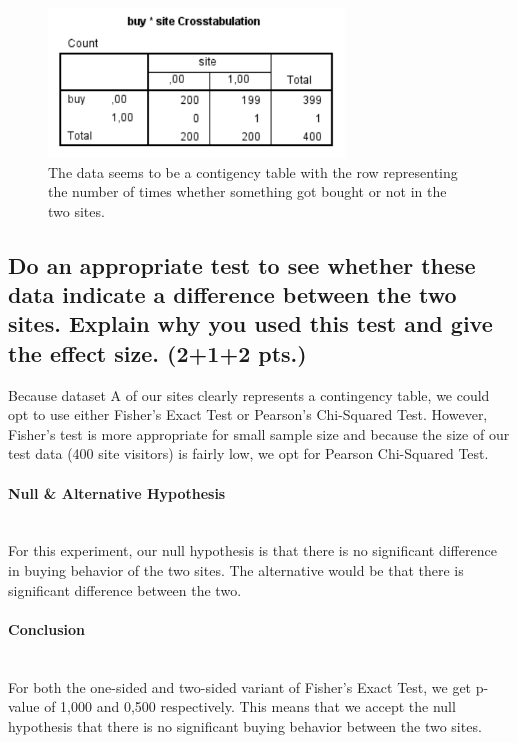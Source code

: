 \documentclass[14]{article}
\begin{document}
\begin{figure}[!htb]
	\includegraphics[width=0.7\textwidth]{img/question2/question2_a.PNG}
	\captionsetup{width=0.8\textwidth}
	\centering 
	\caption{The data seems to be a contigency table with the row representing the number of times whether something got bought or not in the two sites. } 
\end{figure}

\subsection{Do an appropriate test to see whether these data indicate a difference between the two sites. Explain why you used this test and give the effect size. (2+1+2 pts.)}
Because dataset A of our sites clearly represents a contingency table, we could opt to use either Fisher's Exact Test or Pearson's Chi-Squared Test. However, Fisher's test is more appropriate for small sample size and because the size of our test data (400 site visitors) is fairly low, we opt for Pearson Chi-Squared Test.

\paragraph{Null \& Alternative Hypothesis}\mbox{}\\
For this experiment, our null hypothesis is that there is no significant difference in buying behavior of the two sites. The alternative would be that there is significant difference between the two.

\paragraph{Conclusion}\mbox{}\\
For both the one-sided and two-sided variant of Fisher's Exact Test, we get p-value of 1,000 and 0,500 respectively. This means that we accept the null hypothesis that there is no significant buying behavior between the two sites.
\end{document}
